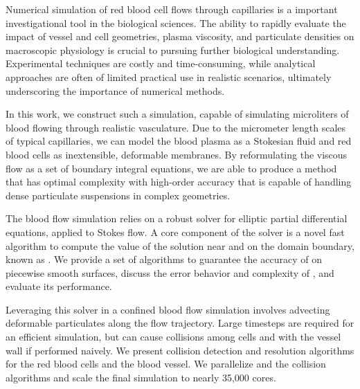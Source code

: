 
Numerical simulation of red blood cell flows through capillaries is a important investigational tool in the biological sciences.
The ability to rapidly evaluate the impact of vessel and cell geometries, plasma viscosity, and particulate densities on macroscopic physiology is crucial to pursuing further biological understanding. 
Experimental techniques are costly and time-consuming, while analytical approaches are often of limited practical use in realistic scenarios, ultimately underscoring the importance of numerical methods.

In this work, we construct such a simulation, capable of simulating microliters of blood flowing through realistic vasculature.
Due to the micrometer length scales of typical capillaries, we can model the blood plasma as a Stokesian fluid and red blood cells as inextensible, deformable membranes.
By reformulating the viscous flow as a set of boundary integral equations, we are able to produce a method that has optimal complexity with high-order accuracy that is capable of handling dense particulate suspensions in complex geometries.

The blood flow simulation relies on a robust solver for elliptic partial differential equations, applied to Stokes flow.
A core component of the solver is a novel fast algorithm to compute the value of the solution near and on the domain boundary, known as \qbkix.
We provide a set of algorithms to guarantee the accuracy of \qbkix on piecewise smooth surfaces, discuss the error behavior and complexity of \qbkix, and evaluate its performance.

Leveraging this solver in a confined blood flow simulation involves advecting deformable particulates along the flow trajectory. 
Large timesteps are required for an efficient simulation, but can cause collisions among cells and with the vessel wall if performed naively. 
We present collision detection and resolution algorithms for the red blood cells and the blood vessel.
We parallelize \qbkix and the collision algorithms and scale the final simulation to nearly 35,000 cores.

